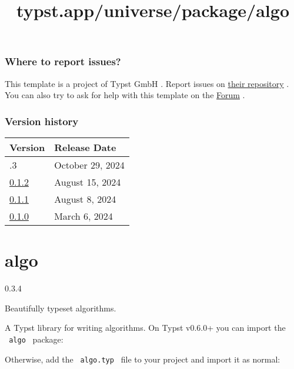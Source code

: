 \subsubsection{Where to report issues?}\label{where-to-report-issues}

This template is a project of Typst GmbH . Report issues on
\href{https://github.com/typst/templates}{their repository} . You can
also try to ask for help with this template on the
\href{https://forum.typst.app}{Forum} .

\label{versions}
\subsubsection{Version history}\label{version-history}

\begin{longtable}[]{@{}ll@{}}
\toprule\noalign{}
Version & Release Date \\
\midrule\noalign{}
\endhead
\bottomrule\noalign{}
\endlastfoot
0.1.3 & October 29, 2024 \\
\href{https://typst.app/universe/package/charged-ieee/0.1.2/}{0.1.2} &
August 15, 2024 \\
\href{https://typst.app/universe/package/charged-ieee/0.1.1/}{0.1.1} &
August 8, 2024 \\
\href{https://typst.app/universe/package/charged-ieee/0.1.0/}{0.1.0} &
March 6, 2024 \\
\end{longtable}


\title{typst.app/universe/package/algo}

\label{banner}
\section{algo}\label{algo}

{ 0.3.4 }

Beautifully typeset algorithms.

\label{readme}
A Typst library for writing algorithms. On Typst v0.6.0+ you can import
the \texttt{\ algo\ } package:

\begin{Shaded}
\begin{Highlighting}[]
\end{Highlighting}
\end{Shaded}

Otherwise, add the \texttt{\ algo.typ\ } file to your project and import
it as normal:

